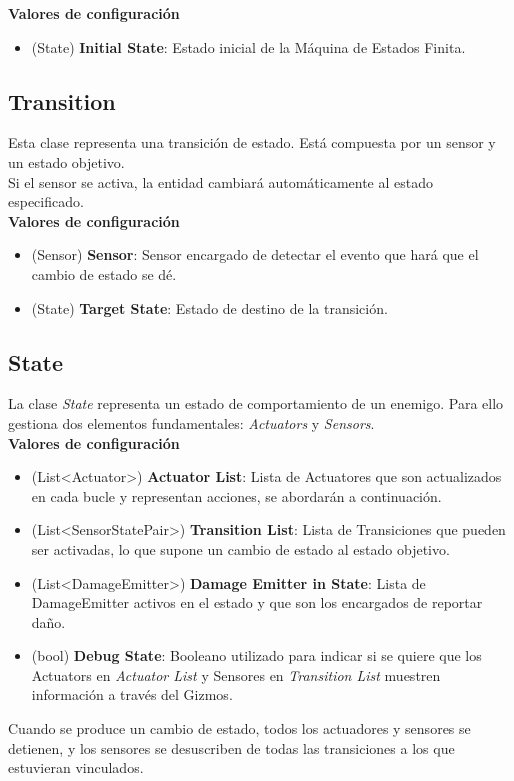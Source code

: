 \textbf{Valores de configuración}
\begin{itemize}
	\item (State) \textbf{Initial State}: Estado inicial de la Máquina de Estados Finita.
\end{itemize}

\subsection{Transition}
Esta clase representa una transición de estado. Está compuesta por un sensor y un estado objetivo.\\

Si el sensor se activa, la entidad cambiará automáticamente al estado especificado.\\

\textbf{Valores de configuración}
\begin{itemize}
	\item (Sensor) \textbf{Sensor}: Sensor encargado de detectar el evento que hará que el cambio de estado se dé.
	\item (State) \textbf{Target State}: Estado de destino de la transición.
\end{itemize}

\subsection{State}

La clase \textit{State} representa un estado de comportamiento de un enemigo. Para ello gestiona dos elementos fundamentales: \textit{Actuators} y \textit{Sensors}.\\

\textbf{Valores de configuración}
\begin{itemize}
	\item (List<Actuator>) \textbf{Actuator List}: Lista de Actuatores que son actualizados en cada bucle y representan acciones, se abordarán a continuación.
	\item (List<SensorStatePair>) \textbf{Transition List}: Lista de Transiciones que pueden ser activadas, lo que supone un cambio de estado al estado objetivo.
	\item (List<DamageEmitter>) \textbf{Damage Emitter in State}: Lista de DamageEmitter activos en el estado y que son los encargados de reportar daño.
	\item (bool) \textbf{Debug State}: Booleano utilizado para indicar si se quiere que los Actuators en \textit{Actuator List} y Sensores en \textit{Transition List} muestren información a través del Gizmos.
\end{itemize}
Cuando se produce un cambio de estado, todos los actuadores y sensores se detienen, y los sensores se desuscriben de todas las transiciones a los que estuvieran vinculados.\\

